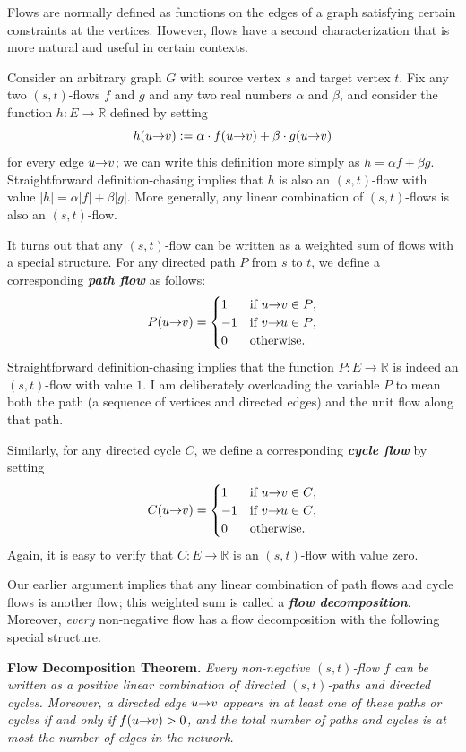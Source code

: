 Flows are normally defined as functions on the edges of a graph satisfying certain constraints at the vertices. However, flows have a second characterization that is more natural and useful in certain contexts.

Consider an arbitrary graph $G$ with source vertex $s$ and target vertex $t$.
Fix any two $(s,t)$-flows $f$ and $g$ and any two real numbers $\alpha$ and $\beta$, and consider the function $h : E \to \mathbb{R}$ defined by setting
\[
h(u\mathord{\rightarrow}v) := \alpha \cdot f(u\mathord{\rightarrow}v) + \beta \cdot g(u\mathord{\rightarrow}v)
\]
for every edge $u\mathord{\rightarrow}v$; we can write this definition more simply as $h = \alpha f + \beta g$.
Straightforward definition-chasing implies that $h$ is also an $(s,t)$-flow with value $|h| = \alpha|f| + \beta|g|$.
More generally, any linear combination of $(s,t)$-flows is also an $(s,t)$-flow.

It turns out that any $(s,t)$-flow can be written as a weighted sum of flows with a special structure.
For any directed path $P$ from $s$ to $t$, we define a corresponding \textbf{\textit{path flow}} as follows:
\[
P(u\mathord{\rightarrow}v) =
\begin{cases}
1 & \text{if $u\mathord{\rightarrow}v \in P$,}\\
-1 & \text{if $v\mathord{\rightarrow}u \in P$,}\\
0 & \text{otherwise.}
\end{cases}
\]
Straightforward definition-chasing implies that the function $P : E \to \mathbb{R}$ is indeed an $(s,t)$-flow with value $1$.
I am deliberately overloading the variable $P$ to mean both the path (a sequence of vertices and directed edges) and the unit flow along that path.

Similarly, for any directed cycle $C$, we define a corresponding \textbf{\textit{cycle flow}} by setting
\[
C(u\mathord{\rightarrow}v) =
\begin{cases}
1 & \text{if $u\mathord{\rightarrow}v \in C$,}\\
-1 & \text{if $v\mathord{\rightarrow}u \in C$,}\\
0 & \text{otherwise.}
\end{cases}
\]
Again, it is easy to verify that $C : E \to \mathbb{R}$ is an $(s,t)$-flow with value zero.

Our earlier argument implies that any linear combination of path flows and cycle flows is another flow; this weighted sum is called a \textbf{\textit{flow decomposition}}.
Moreover, \textit{every} non-negative flow has a flow decomposition with the following special structure.

\noindent\textbf{Flow Decomposition Theorem.} \textsl{Every non-negative $(s,t)$-flow $f$ can be written as a positive linear combination of directed $(s,t)$-paths and directed cycles. Moreover, a directed edge $u\mathord{\rightarrow}v$ appears in at least one of these paths or cycles if and only if $f(u\mathord{\rightarrow}v) > 0$, and the total number of paths and cycles is at most the number of edges in the network.}

